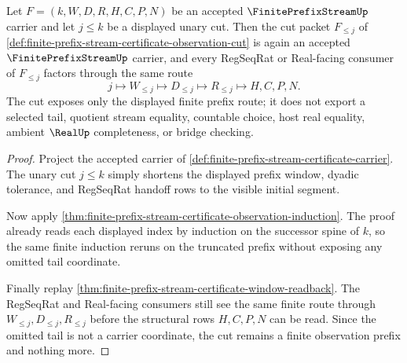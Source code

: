 \begin{theorem}
\label{thm:finite-prefix-stream-certificate-observation-cut}
Let $F=(k,W,D,R,H,C,P,N)$ be an accepted $\FinitePrefixStreamUp$ carrier and let $j \leq k$ be a displayed unary cut. Then the cut packet $F_{\leq j}$ of \autoref{def:finite-prefix-stream-certificate-observation-cut} is again an accepted $\FinitePrefixStreamUp$ carrier, and every RegSeqRat or Real-facing consumer of $F_{\leq j}$ factors through the same route
$$
j \longmapsto W_{\leq j} \longmapsto D_{\leq j} \longmapsto R_{\leq j} \longmapsto H,C,P,N .
$$
The cut exposes only the displayed finite prefix route; it does not export a selected tail, quotient stream equality, countable choice, host real equality, ambient $\RealUp$ completeness, or bridge checking.
\end{theorem}
\begin{proof}
Project the accepted carrier of \autoref{def:finite-prefix-stream-certificate-carrier}. The unary cut $j \leq k$ simply shortens the displayed prefix window, dyadic tolerance, and RegSeqRat handoff rows to the visible initial segment.

Now apply \autoref{thm:finite-prefix-stream-certificate-observation-induction}. The proof already reads each displayed index by induction on the successor spine of $k$, so the same finite induction reruns on the truncated prefix without exposing any omitted tail coordinate.

Finally replay \autoref{thm:finite-prefix-stream-certificate-window-readback}. The RegSeqRat and Real-facing consumers still see the same finite route through $W_{\leq j},D_{\leq j},R_{\leq j}$ before the structural rows $H,C,P,N$ can be read. Since the omitted tail is not a carrier coordinate, the cut remains a finite observation prefix and nothing more.
\end{proof}

